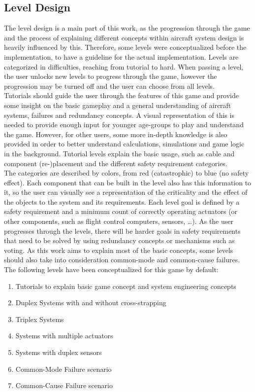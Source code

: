 \subsection{Level Design}\label{subsec:level-design}
The level design is a main part of this work, as the progression through the game and the process of explaining different concepts
within aircraft system design is heavily influenced by this.
Therefore, some levels were conceptualized before the implementation, to have a guideline for the actual implementation.
Levels are categorized in difficulties, reaching from tutorial to hard.
When passing a level, the user unlocks new levels to progress through the game, however the progression may be turned off and the user can choose from all
levels.
\\
Tutorials should guide the user through the features of this game and provide some insight on the basic gameplay and a general
understanding of aircraft systems, failures and redundancy concepts.
A visual representation of this is needed to provide enough input for younger age-groups to play and understand the game.
However, for other users, some more in-depth knowledge is also provided in order to better understand calculations, simulations and
game logic in the background.
Tutorial levels explain the basic usage, such as cable and component (re-)placement and the different safety requirement
categories.
\\
The categories are described by colors, from red (catastrophic) to blue (no safety effect).
Each component that can be built in the level also has this information to it, so the user can visually see a representation
of the criticality and the effect of the objects to the system and its requirements.
Each level goal is defined by a safety requirement and a minimum count of correctly operating actuators (or other components, such
as flight control computers, sensors, \ldots).
As the user progresses through the levels, there will be harder goals in safety requirements that need to be solved by using
redundancy concepts or mechanisms such as voting.
As this work aims to explain most of the basic concepts, some levels should also take into consideration common-mode and common-cause
failures.
\\
The following levels have been conceptualized for this game by default:
\begin{enumerate}
    \item Tutorials to explain basic game concept and system engineering concepts
    \item Duplex Systems with and without cross-strapping
    \item Triplex Systems
    \item Systems with multiple actuators
    \item Systems with duplex sensors
    \item Common-Mode Failure scenario
    \item Common-Cause Failure scenario
\end{enumerate}
